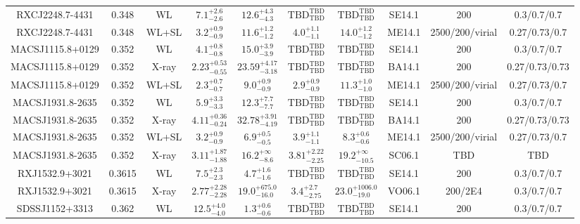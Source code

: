 \begin{table}
\begin{tabular}{cccccccccc}
RXCJ2248.7-4431 & 0.348 & WL & ${7.1}^{+2.6}_{-2.6}$ & ${12.6}^{+4.3}_{-4.3}$ & ${\mathrm{TBD}}^{\mathrm{TBD}}_{\mathrm{TBD}}$ & ${\mathrm{TBD}}^{\mathrm{TBD}}_{\mathrm{TBD}}$ & SE14.1 & 200 & 0.3/0.7/0.7 \\
RXCJ2248.7-4431 & 0.348 & WL+SL & ${3.2}^{+0.9}_{-0.9}$ & ${11.6}^{+1.2}_{-1.2}$ & ${4.0}^{+1.1}_{-1.1}$ & ${14.0}^{+1.2}_{-1.2}$ & ME14.1 & 2500/200/virial & 0.27/0.73/0.7 \\
MACSJ1115.8+0129 & 0.352 & WL & ${4.1}^{+0.8}_{-0.8}$ & ${15.0}^{+3.9}_{-3.9}$ & ${\mathrm{TBD}}^{\mathrm{TBD}}_{\mathrm{TBD}}$ & ${\mathrm{TBD}}^{\mathrm{TBD}}_{\mathrm{TBD}}$ & SE14.1 & 200 & 0.3/0.7/0.7 \\
MACSJ1115.8+0129 & 0.352 & X-ray & ${2.23}^{+0.53}_{-0.55}$ & ${23.59}^{+4.17}_{-3.18}$ & ${\mathrm{TBD}}^{\mathrm{TBD}}_{\mathrm{TBD}}$ & ${\mathrm{TBD}}^{\mathrm{TBD}}_{\mathrm{TBD}}$ & BA14.1 & 200 & 0.27/0.73/0.73 \\
MACSJ1115.8+0129 & 0.352 & WL+SL & ${2.3}^{+0.7}_{-0.7}$ & ${9.0}^{+0.9}_{-0.9}$ & ${2.9}^{+0.9}_{-0.9}$ & ${11.3}^{+1.0}_{-1.0}$ & ME14.1 & 2500/200/virial & 0.27/0.73/0.7 \\
MACSJ1931.8-2635 & 0.352 & WL & ${5.9}^{+3.3}_{-3.3}$ & ${12.3}^{+7.7}_{-7.7}$ & ${\mathrm{TBD}}^{\mathrm{TBD}}_{\mathrm{TBD}}$ & ${\mathrm{TBD}}^{\mathrm{TBD}}_{\mathrm{TBD}}$ & SE14.1 & 200 & 0.3/0.7/0.7 \\
MACSJ1931.8-2635 & 0.352 & X-ray & ${4.11}^{+0.36}_{-0.24}$ & ${32.78}^{+3.91}_{-4.19}$ & ${\mathrm{TBD}}^{\mathrm{TBD}}_{\mathrm{TBD}}$ & ${\mathrm{TBD}}^{\mathrm{TBD}}_{\mathrm{TBD}}$ & BA14.1 & 200 & 0.27/0.73/0.73 \\
MACSJ1931.8-2635 & 0.352 & WL+SL & ${3.2}^{+0.9}_{-0.9}$ & ${6.9}^{+0.5}_{-0.5}$ & ${3.9}^{+1.1}_{-1.1}$ & ${8.3}^{+0.6}_{-0.6}$ & ME14.1 & 2500/200/virial & 0.27/0.73/0.7 \\
MACSJ1931.8-2635 & 0.352 & X-ray & ${3.11}^{+1.87}_{-1.88}$ & ${16.2}^{+\infty}_{-8.6}$ & ${3.81}^{+2.22}_{-2.25}$ & ${19.2}^{+\infty}_{-10.5}$ & SC06.1 & TBD & TBD \\
RXJ1532.9+3021 & 0.3615 & WL & ${7.5}^{+2.3}_{-2.3}$ & ${4.7}^{+1.6}_{-1.6}$ & ${\mathrm{TBD}}^{\mathrm{TBD}}_{\mathrm{TBD}}$ & ${\mathrm{TBD}}^{\mathrm{TBD}}_{\mathrm{TBD}}$ & SE14.1 & 200 & 0.3/0.7/0.7 \\
RXJ1532.9+3021 & 0.3615 & X-ray & ${2.77}^{+2.28}_{-2.28}$ & ${19.0}^{+675.0}_{-16.0}$ & ${3.4}^{+2.7}_{-2.75}$ & ${23.0}^{+1006.0}_{-19.0}$ & VO06.1 & 200/2E4 & 0.3/0.7/0.7 \\
SDSSJ1152+3313 & 0.362 & WL & ${12.5}^{+4.0}_{-4.0}$ & ${1.3}^{+0.6}_{-0.6}$ & ${\mathrm{TBD}}^{\mathrm{TBD}}_{\mathrm{TBD}}$ & ${\mathrm{TBD}}^{\mathrm{TBD}}_{\mathrm{TBD}}$ & SE14.1 & 200 & 0.3/0.7/0.7 \\

\end{tabular}
\end{table}
